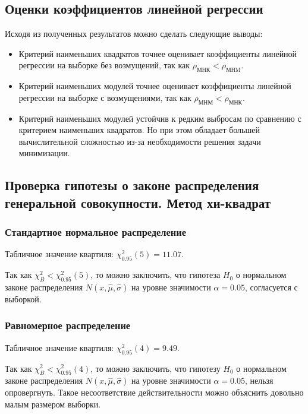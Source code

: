\documentclass[12pt,a4paper]{article}
\begin{document}
	\subsection{Оценки коэффициентов линейной регрессии}
		Исходя из полученных результатов можно сделать следующие выводы:
		\begin{itemize}
			\item  Критерий наименьших квадратов точнее оценивает коэффициенты линейной регрессии на выборке без возмущений, так как $\rho_\text{МНК}<\rho_\text{МНM}$.
			
			\item Критерий наименьших модулей точнее оценивает коэффициенты линейной регрессии на выборке с возмущениями, так как $\rho_\text{МНМ}<\rho_\text{МНК}$.
			
			\item Критерий наименьших модулей устойчив к редким выбросам по сравнению с критерием наименьших квадратов. Но при этом обладает большей вычислительной сложностью из-за необходимости решения задачи минимизации.
		\end{itemize}

	\subsection{Проверка гипотезы о законе распределения генеральной совокупности. Метод хи-квадрат}
		\subsubsection{Стандартное нормальное распределение}
			Табличное значение квартиля: $\chi^2_{0.95}(5) = 11.07$.
			
			Так как $\chi^2_B < \chi^2_{0.95}(5)$, то можно заключить, что гипотеза $H_0$ о нормальном законе распределения $N(x, \hat{\mu}, \hat{\sigma})$ на уровне значимости $\alpha = 0.05$, согласуется с выборкой.
			
		\subsubsection{Равномерное распределение}
			Табличное значение квартиля: $\chi^2_{0.95}(4) = 9.49$.
			
			Так как $\chi^2_B < \chi^2_{0.95}(4)$, то можно заключить, что гипотезу $H_0$ о нормальном законе распределения $N(x, \hat{\mu}, \hat{\sigma})$ на уровне значимости $\alpha = 0.05$, нельзя опровергнуть. Такое несоответствие действительности можно объяснить довольно малым размером выборки.
			
\end{document}
